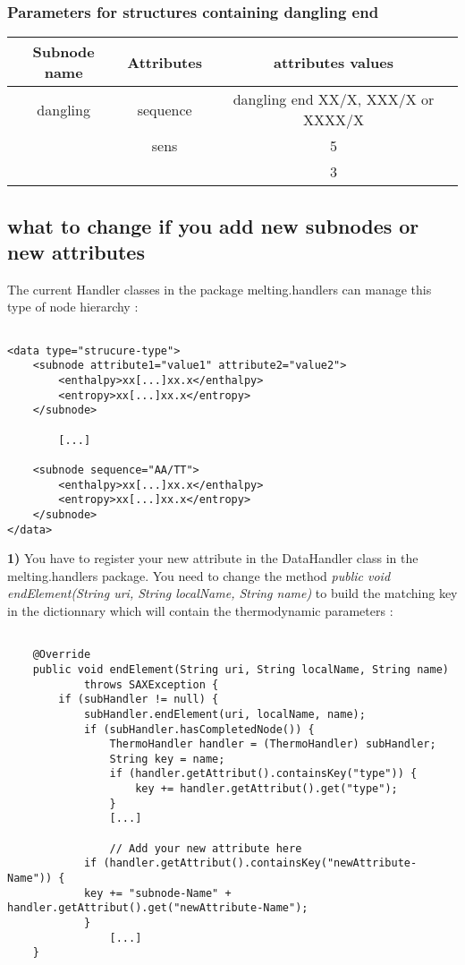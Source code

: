 \documentclass{article}
\begin{document}
\pagebreak
\subsubsection{Parameters for structures containing dangling end}

\begin{table}[h]
\begin{tabular}[h]{| c | c | c |}
\textbf{Subnode name} & \textbf{Attributes} & \textbf{attributes values} \\
 \hline
dangling & sequence & dangling end XX/X, XXX/X or XXXX/X \\
 & sens & 5 \\
 & & 3 \\
  \hline
\end{tabular}
\end{table}

\subsection{what to change if you add new subnodes or new attributes}

The current Handler classes in the package melting.handlers can manage
this type of node hierarchy :

\begin{verbatim}

<data type="strucure-type">
	<subnode attribute1="value1" attribute2="value2">
		<enthalpy>xx[...]xx.x</enthalpy>
		<entropy>xx[...]xx.x</entropy>
	</subnode> 
	   	
	   	[...]
	
	<subnode sequence="AA/TT">
		<enthalpy>xx[...]xx.x</enthalpy>
		<entropy>xx[...]xx.x</entropy>
	</subnode> 	   	
</data>

\end{verbatim}

\textbf{1)} You have to register your new attribute in the DataHandler class in the melting.handlers
package. You need to change the method \textit{public void endElement(String uri, String localName, String name)} 
to build the matching key in the dictionnary which will contain the thermodynamic parameters :

\begin{verbatim}

	@Override
	public void endElement(String uri, String localName, String name)
			throws SAXException {
		if (subHandler != null) {
			subHandler.endElement(uri, localName, name);
			if (subHandler.hasCompletedNode()) {
				ThermoHandler handler = (ThermoHandler) subHandler;
				String key = name;
				if (handler.getAttribut().containsKey("type")) {
					key += handler.getAttribut().get("type");
				}
				[...]
				
				// Add your new attribute here
			if (handler.getAttribut().containsKey("newAttribute-Name")) {
			key += "subnode-Name" + handler.getAttribut().get("newAttribute-Name");
			}
				[...]
	}

\end{verbatim}
\end{document}
